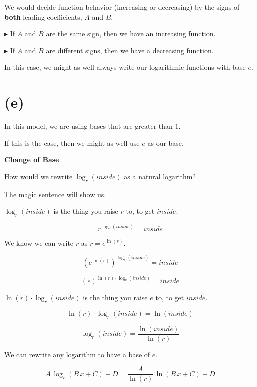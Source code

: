 \documentclass{ximera}
\begin{document}
We would decide function behavior (increasing or decreasing) by the signs of \textbf{both} leading coefficients, $A$ and $B$.

\textbf{\textcolor{red!70!darkgray}{$\blacktriangleright$}} If $A$ and $B$ are the same sign, then we have an increasing function. 

\textbf{\textcolor{red!70!darkgray}{$\blacktriangleright$}} If $A$ and $B$ are different signs, then we have a decreasing function. 






In this case, we might as well always write our logarithmic functions with base $e$.

\section*{(e)}



In this model, we are using bases that are greater than $1$.  


If this is the case, then we might as well use $e$ as our base. 


\begin{explanation} \textbf{\textcolor{red!75!green}{Change of Base}} 


How would we rewrite $\log_r(inside)$ as a natural logarithm? 

The magic sentence will show us.



$\log_r(inside)$ is the thing you raise $r$ to, to get $inside$.

\[
r^{\log_r(inside)} = inside
\]


We know we can write $r$ as $r = e^{\ln(r)}$. 

\[
\left(  e^{\ln(r)} \right)^{\log_r(inside)} = inside
\]


\[
\left(  e \right)^{\ln(r) \cdot \log_r(inside)} = inside
\]


$\ln(r) \cdot \log_r(inside)$ is the thing you raise $e$ to, to get $inside$.



\[
\ln(r) \cdot \log_r(inside) = \ln(inside)
\]


\[
\log_r(inside) = \frac{\ln(inside)}{\ln(r)}
\]



We can rewrite any logarithm to have a base of $e$.


\[
A \, \log_r(B \, x + C) + D = \frac{A}{\ln(r)} \, \ln(B \, x + C) + D
\]



\end{explanation}
\end{document}
